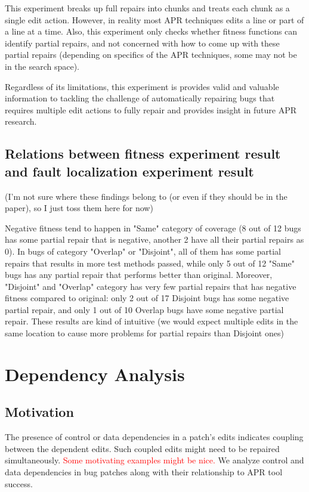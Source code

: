 \documentclass[sigconf, timestamp-false, anonymous=true]{acmart}
\newcommand\todo[1]{\textcolor{red}{#1}}
\begin{document}
This experiment breaks up full repairs into chunks and treats each chunk as a single edit action. However, in reality most APR techniques edits a line or part of a line at a time. Also, this experiment only checks whether fitness functions can identify partial repairs, and not concerned with how to come up with these partial repairs (depending on specifics of the APR techniques, some may not be in the search space).

Regardless of its limitations, this experiment is provides valid and valuable information to tackling the challenge of automatically repairing bugs that requires multiple edit actions to fully repair and provides insight in future APR research.

\subsection{Relations between fitness experiment result and fault localization experiment result}

(I'm not sure where these findings belong to (or even if they should be in the paper), so I just toss them here for now)

Negative fitness tend to happen in "Same" category of coverage (8 out of 12 bugs has some partial repair that is negative, another 2 have all their partial repairs as 0). In bugs of category "Overlap" or "Disjoint", all of them has some partial repairs that results in more test methods passed, while only 5 out of 12 "Same" bugs has any partial repair that performs better than original. Moreover, "Disjoint" and "Overlap" category has very few partial repairs that has negative fitness compared to original: only 2 out of 17 Disjoint bugs has some negative partial repair, and only 1 out of 10 Overlap bugs have some negative partial repair. These results are kind of intuitive (we would expect multiple edits in the same location to cause more problems for partial repairs than Disjoint ones)

\section{Dependency Analysis}

\subsection{Motivation}
The presence of control or data dependencies in a patch's edits 
indicates coupling between the dependent edits.
Such coupled edits might need to be repaired simultaneously.
\todo{Some motivating examples might be nice.}
We analyze control and data dependencies in bug patches along 
with their relationship to APR tool success.
\end{document}
